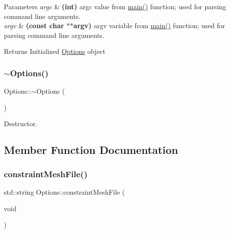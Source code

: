 \begin{DoxyParams}{Parameters}
{\em argc} & {\bfseries (int)} argc value from \mbox{\hyperlink{main_8cpp_ac0f2228420376f4db7e1274f2b41667c}{main()}} function; used for parsing command line arguments. \\
\hline
{\em argv} & {\bfseries (const char $\ast$$\ast$argv)} argv variable from \mbox{\hyperlink{main_8cpp_ac0f2228420376f4db7e1274f2b41667c}{main()}} function; used for parsing command line arguments. \\
\hline
\end{DoxyParams}
\begin{DoxyReturn}{Returns}
Initialized \mbox{\hyperlink{class_options}{Options}} object 
\end{DoxyReturn}
\mbox{\label{class_options_a86ddb85b183f8b58af5481f30a42fa92}} 
\subsubsection{\texorpdfstring{$\sim$\+Options()}{~Options()}}
{\footnotesize\ttfamily Options\+::$\sim$\+Options (\begin{DoxyParamCaption}{ }\end{DoxyParamCaption})}



Destructor. 



\subsection{Member Function Documentation}
\mbox{\label{class_options_a9a48486277bc0f417308735c88f06a21}} 
\subsubsection{\texorpdfstring{constraint\+Mesh\+File()}{constraintMeshFile()}}
{\footnotesize\ttfamily std\+::string Options\+::constraint\+Mesh\+File (\begin{DoxyParamCaption}\item[{void}]{ }\end{DoxyParamCaption})\hspace{0.3cm}{\ttfamily [inline]}}



